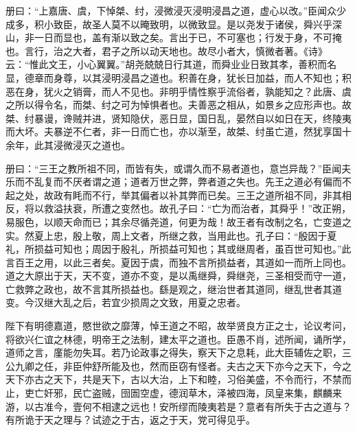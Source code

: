 \documentclass[12pt,UTF8]{ctexbook}
\begin{document}
册曰：“上嘉唐、虞，下悼桀、纣，浸微浸灭浸明浸昌之道，虚心以改。”臣闻众少成多，积小致臣，故圣人莫不以晻致明，以微致显。是以尧发于诸侯，舜兴乎深山，非一日而显也，盖有渐以致之矣。言出于已，不可塞也；行发于身，不可掩也。言行，治之大者，君子之所以动天地也。故尽小者大，慎微者著。《诗》云：“惟此文王，小心翼翼。”胡尧兢兢日行其道，而舜业业日致其孝，善积而名显，德章而身尊，以其浸明浸昌之道也。积善在身，犹长日加益，而人不知也；积恶在身，犹火之销膏，而人不见也。非明乎情性察乎流俗者，孰能知之？此唐、虞之所以得令名，而桀、纣之可为悼惧者也。夫善恶之相从，如景乡之应形声也。故桀、纣暴谩，谗贼并进，贤知隐伏，恶日显，国日乱，晏然自以如日在天，终陵夷而大坏。夫暴逆不仁者，非一日而亡也，亦以渐至，故桀、纣虽亡道，然犹享国十余年，此其浸微浸灭之道也。



册曰：“三王之教所祖不同，而皆有失，或谓久而不易者道也，意岂异哉？”臣闻夫乐而不乱复而不厌者谓之道；道者万世之弊，弊者道之失也。先王之道必有偏而不起之处，故政有眊而不行，举其偏者以补其弊而已矣。三王之道所祖不同，非其相反，将以救溢扶衰，所遭之变然也。故孔子曰：“亡为而治者，其舜乎！”改正朔，易服色，以顺天命而已；其余尽循尧道，何更为哉！故王者有改制之名，亡变道之实。然夏上忠，殷上敬，周上文者，所继之救，当用此也。孔子曰：“殷因于夏礼，所损益可知也；周因于殷礼，所损益可知也；其或继周者，虽百世可知也。”此言百王之用，以此三者矣。夏因于虞，而独不言所损益者，其道如一而所上同也。道之大原出于天，天不变，道亦不变，是以禹继舜，舜继尧，三圣相受而守一道，亡救弊之政也，故不言其所损益也。繇是观之，继治世者其道同，继乱世者其道变。今汉继大乱之后，若宜少损周之文致，用夏之忠者。



陛下有明德嘉道，愍世欲之靡薄，悼王道之不昭，故举贤良方正之士，论议考问，将欲兴仁谊之林德，明帝王之法制，建太平之道也。臣愚不肖，述所闻，诵所学，道师之言，廑能勿失耳。若乃论政事之得失，察天下之息耗，此大臣辅佐之职，三公九卿之任，非臣仲舒所能及也，然而臣窃有怪者。夫古之天下亦今之天下，今之天下亦古之天下，共是天下，古以大治，上下和睦，习俗美盛，不令而行，不禁而止，吏亡奸邪，民亡盗贼，囹圄空虚，德润草木，泽被四海，凤皇来集，麒麟来游，以古准今，壹何不相逮之远也！安所缪而陵夷若是？意者有所失于古之道与？有所诡于天之理与？试迹之于古，返之于天，党可得见乎。
\end{document}
